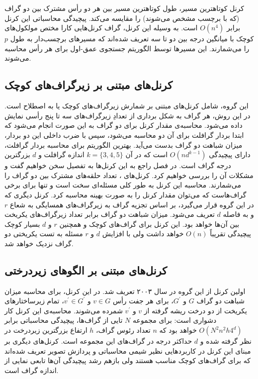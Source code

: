 کرنل کوتاهترین مسیر، طول کوتاهترین مسیر بین هر دو رأس مشترک بین دو گراف (که با برچسب مشخص می‌شوند) را مقایسه می‌کند. پیچیدگی محاسباتی این کرنل برابر $O(n^4)$ است. به وسیله این کرنل، گراف کرنل‌هایی کارا مختص مولکول‌های کوچک با میانگین درجه بین دو تا سه تعریف شده‌اند که مسیرهای برچسب‌دار به طول $p$ را می‌شمارند. این مسیر‌ها توسط الگوریتم جستجوی عمق-اول برای هر رأس محاسبه می‌شوند.

\subsection{کرنل‌های مبتنی بر زیرگراف‌های کوچک}\label{sec:subgraph-kernels}
این گروه، شامل کرنل‌های مبتنی بر شمارش زیرگراف‌های کوچک یا به اصطلاح  است. در این روش، هر گراف به شکل برداری از تعدادِ زیرگراف‌های سه تا پنج رأسی نمایش داده می‌شود. محاسبه‌ی مقدار کرنل برای دو گراف به این صورت انجام می‌شود که ابتدا بردار گرافلت برای آن دو محاسبه می‌شود، سپس با ضرب داخلی این دو بردار، میزان شباهت دو گراف بدست می‌آید. بهترین الگوریتم برای محاسبه بردار گرافلت، دارای پیچیدگی $O(nd^{k-1})$ است که در آن $k = \lbrace{3,4,5}\rbrace$ اندازه گرافلت و $d$ بزرگترین درجه گراف است. در فصل  راجع به این کرنل‌ها به تفصیل سخن خواهیم گفت و مشکلات آن‌ را بررسی خواهیم کرد.
کرنل‌های ، تعداد حلقه‌های مشترک بین دو گراف را می‌شمارند. محاسبه این کرنل به طور کلی مسئله‌ای  سخت است و تنها برای برخی گراف‌هاست که می‌توان مقدار کرنل را به صورت بهینه محاسبه کرد. کرنل دیگری که در این گروه قرار می‌گیرد، بر اساس تجزیه گراف به زیرگراف‌های همسایگی به شعاع $r$ و به فاصله $d$ تعریف می‌شود. میزان شباهت دو گراف برابر تعداد زیرگراف‌های یکریخت بین آن‌ها خواهد بود. این کرنل برای گراف‌های کوچک و همچنین $r$ و $d$ بسیار کوچک پیچیدگی تقریباً $O(n)$ خواهد داشت ولی با افزایش $d$ و $r$ مسئله به تست یکریختی دو گراف نزدیک خواهد شد.

\subsection{کرنل‌های مبتنی بر الگوهای زیردرختی}
اولین کرنل از این گروه در سال ۲۰۰۳ تعریف شد. در این کرنل، برای محاسبه میزان شباهت دو گراف $G$ و $G^\prime$، برای هر جفت رأس $v \in G$ و $v^\prime \in G^\prime$، تمام زیرساختارهای یکریخت از دو درخت ریشه گرفته از $v$ و $v^\prime$ شمرده می‌شوند. محاسبه‌ی این کرنل کار دشواری است: برای مجموعه $N$ تایی از گراف‌ها، پیچیدگی محاسباتی برابر $O(N^2n^2h4^d)$ خواهد بود که $n$ تعداد رئوس گراف، $h$ ارتفاع بزرگترین زیردرخت در نظر گرفته شده و $d$ حداکثر درجه در گراف‌های این مجموعه است. کرنل‌های دیگری بر مبنای این کرنل در کاربردهایی نظیر شیمی محاسباتی و پردازش تصویر تعریف شده‌اند که برای گراف‌های کوچک مناسب هستند ولی بازهم رشد پیچیدگی آن‌ها تابعی نمایی از اندازه گراف است.

